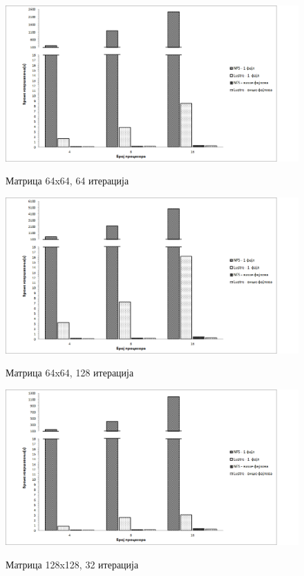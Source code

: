      \begin{figure}[H]
       \centering
           \includegraphics[width=1\textwidth]{slike/results/64_64.png}\\[1cm]
        \caption{Матрица 64x64, 64 итерација}
     \end{figure}
     
      \begin{figure}[H]
        \centering
            \includegraphics[width=1\textwidth]{slike/results/64_128.png}\\[1cm]
         \caption{Матрица 64x64, 128 итерација}
      \end{figure}
      
      \begin{figure}[H]
        \centering
            \includegraphics[width=1\textwidth]{slike/results/128_32.png}\\[1cm]
        \caption{Матрица 128x128, 32 итерација}
      \end{figure}
      
